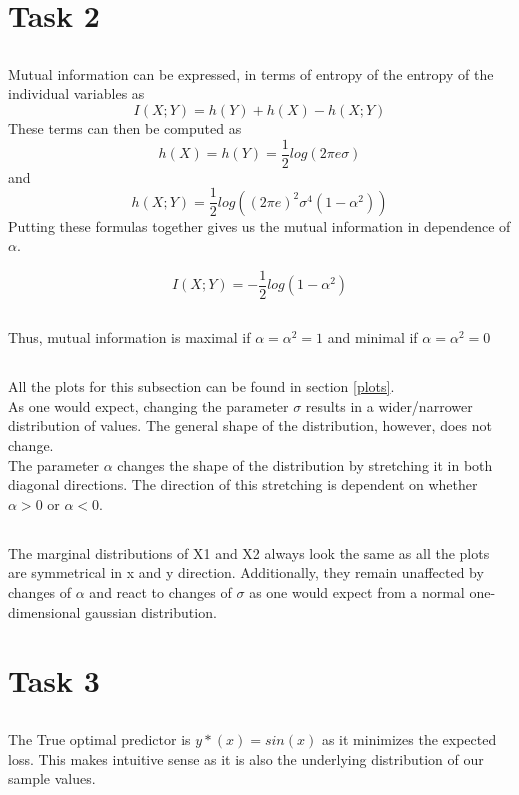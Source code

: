 \documentclass{article}
\begin{document}
\section{Task 2}
\subsection{}
Mutual information can be expressed, in terms of entropy of the entropy of the individual variables as
$$I(X;Y)=h(Y)+h(X)-h(X;Y)$$
These terms can then be computed as
$$h(X)=h(Y)=\frac{1}{2}log(2\pi e\sigma )$$
and
$$h(X;Y)=\frac{1}{2}log((2\pi e)^2\sigma ^4(1-\alpha ^2))$$
Putting these formulas together gives us the mutual information in dependence of $\alpha$.

$$I(X;Y)=-\frac{1}{2}log(1-\alpha^2)$$

\subsection{}
Thus, mutual information is maximal if $\alpha =\alpha ^2=1$ and minimal if $\alpha =\alpha ^2=0$

\subsection{}
All the plots for this subsection can be found in section \ref{plots}.\\
As one would expect, changing the parameter $\sigma$ results in a wider/narrower distribution of values. The general shape of the distribution, however, does not change.\\
The parameter $\alpha$ changes the shape of the distribution by stretching it in both diagonal directions. The direction of this stretching is dependent on whether $\alpha > 0$ or $\alpha < 0$.

\subsection{}
The marginal distributions of X1 and X2 always look the same as all the plots are symmetrical in x and y direction. Additionally, they remain unaffected by changes of $\alpha$ and react to changes of $\sigma$ as one would expect from a normal one-dimensional gaussian distribution.

\section{Task 3}
\subsection{}
The True optimal predictor is $y*(x)=sin(x)$ as it minimizes the expected loss. This makes intuitive sense as it is also the underlying distribution of our sample values.
\end{document}
